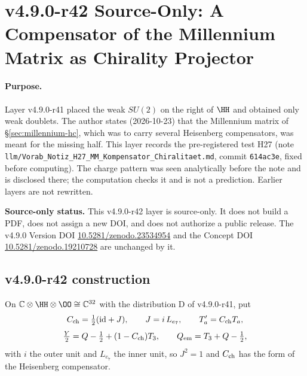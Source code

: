 \clearpage
\section*{v4.9.0-r42 Source-Only: A Compensator of the Millennium Matrix as Chirality Projector}
\label{sec:v490-r42-mm-compensator-chirality}

\paragraph{Purpose.}
Layer v4.9.0-r41 placed the weak \(SU(2)\) on the right of \(\HH\) and obtained only weak doublets.  The author states (2026-10-23) that
the Millennium matrix of \S\ref{sec:millennium-hc}, which was to carry several Heisenberg compensators, was meant for the missing half.
This layer records the pre-registered test H27 (note \texttt{llm/Vorab\_Notiz\_H27\_MM\_Kompensator\_Chiralitaet.md}, commit
\texttt{614ac3e}, fixed before computing).  The charge pattern was seen analytically before the note and is disclosed there; the
computation checks it and is not a prediction.  Earlier layers are not rewritten.

\noindent\textbf{Source-only status.}
This v4.9.0-r42 layer is source-only.  It does not build a PDF, does not assign a new DOI,
and does not authorize a public release.  The v4.9.0 Version DOI
\href{https://doi.org/10.5281/zenodo.23534954}{10.5281/zenodo.23534954} and the Concept DOI
\href{https://doi.org/10.5281/zenodo.19210728}{10.5281/zenodo.19210728} are unchanged by it.

\subsection*{v4.9.0-r42 construction}
\label{subsec:v490-r42-construction}

On \(\mathbb C\otimes\HH\otimes\OO\cong\mathbb C^{32}\) with the distribution D of v4.9.0-r41, put
\[
C_{\rm ch}=\tfrac12(\mathrm{id}+J),\qquad J=i\,L_{e_7},\qquad T_a'=C_{\rm ch}T_a,
\]
\[
\tfrac{Y}{2}=Q-\tfrac12+(1-C_{\rm ch})T_3,\qquad Q_{\rm em}=T_3+Q-\tfrac12 ,
\]
with \(i\) the outer unit and \(L_{e_7}\) the inner unit, so \(J^2=1\) and \(C_{\rm ch}\) has the form of the Heisenberg compensator.


